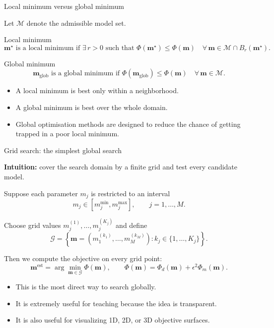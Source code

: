 \documentclass[aspectratio=169]{beamer}
\renewcommand{\vec}[1]{\mathbf{#1}}
\newcommand{\mm}{ {\vec{m}} }
\newcommand{\mest}{ {\vec{m}^{\text{est}}} }
\begin{document}
\begin{frame}{Local minimum versus global minimum}
\small

Let $\mathcal{M}$ denote the admissible model set.

\begin{block}{Local minimum}
\[
\mm^\star \text{ is a local minimum if } \exists\,r>0 \text{ such that }
\Phi(\mm^\star) \leq \Phi(\mm)
\quad \forall\, \mm \in \mathcal{M}\cap B_r(\mm^\star).
\]
\end{block}

\begin{block}{Global minimum}
\[
\mm_{\mathrm{glob}} \text{ is a global minimum if }
\Phi(\mm_{\mathrm{glob}}) \leq \Phi(\mm)
\quad \forall\, \mm \in \mathcal{M}.
\]
\end{block}

\begin{itemize}
    \item[--] A local minimum is best only within a neighborhood.
    \item[--] A global minimum is best over the whole domain.
    \item[--] Global optimisation methods are designed to reduce the chance of getting trapped in a poor local minimum.
\end{itemize}
\end{frame}

\begin{frame}{Grid search: the simplest global search}
\small

\textbf{Intuition:} cover the search domain by a finite grid and test every candidate model.

\vspace{0.15cm}

Suppose each parameter $m_j$ is restricted to an interval
\[
m_j \in [m_j^{\min}, m_j^{\max}], \qquad j=1,\dots,M.
\]

Choose grid values $m_j^{(1)},\dots,m_j^{(K_j)}$ and define
\[
\mathcal{G}
=
\left\{
\mm=(m_1^{(k_1)},\dots,m_M^{(k_M)}) : k_j\in\{1,\dots,K_j\}
\right\}.
\]

Then we compute the objective on every grid point:
\[
\mest = \arg\min_{\mm\in\mathcal{G}} \Phi(\mm),
\qquad
\Phi(\mm)=\Phi_d(\mm)+\epsilon^2\Phi_m(\mm).
\]

\begin{itemize}
    \item[--] This is the most direct way to search globally.
    \item[--] It is extremely useful for teaching because the idea is transparent.
    \item[--] It is also useful for visualizing 1D, 2D, or 3D objective surfaces.
\end{itemize}
\end{frame}
\end{document}
